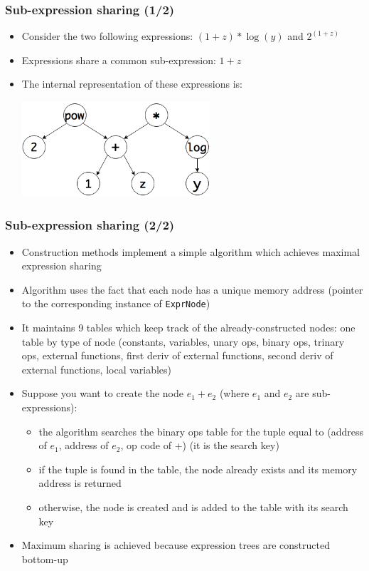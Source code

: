 \documentclass{beamer}
\begin{document}
\begin{frame}
  \frametitle{Sub-expression sharing (1/2)}
  \begin{itemize}
  \item Consider the two following expressions: $(1+z)*\log(y)$ and $2^{(1+z)}$
  \item Expressions share a common sub-expression: $1+z$
  \item The internal representation of these expressions is:
    \begin{center}
      \includegraphics[width=7cm]{expr-sharing.png}
    \end{center}
  \end{itemize}
\end{frame}

\begin{frame}
  \frametitle{Sub-expression sharing (2/2)}
  \begin{itemize}
  \item Construction methods implement a simple algorithm which achieves maximal expression sharing
  \item Algorithm uses the fact that each node has a unique memory address (pointer to the corresponding instance of \texttt{ExprNode})
  \item It maintains 9 tables which keep track of the already-constructed nodes: one table by type of node (constants, variables, unary ops, binary ops, trinary ops, external functions, first deriv of external functions, second deriv of external functions, local variables)
  \item Suppose you want to create the node $e_1+e_2$ (where $e_1$ and $e_2$ are sub-expressions):
    \begin{itemize}
    \item the algorithm searches the binary ops table for the tuple equal to (address of $e_1$, address of $e_2$, op code of +) (it is the \alert{search key})
    \item if the tuple is found in the table, the node already exists and its memory address is returned
    \item otherwise, the node is created and is added to the table with its search key
    \end{itemize}
  \item Maximum sharing is achieved because expression trees are constructed bottom-up
  \end{itemize}
\end{frame}
\end{document}
